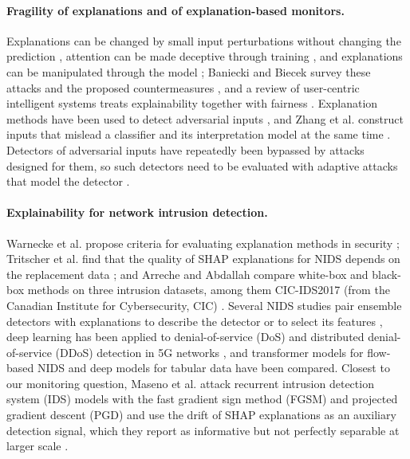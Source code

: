 \paragraph{Fragility of explanations and of explanation-based monitors.}
Explanations can be changed by small input perturbations without changing the prediction
\cite{ghorbani2019,dombrowski2019}, attention can be made deceptive through training \cite{pruthi2020}, and
explanations can be manipulated through the model \cite{heo2019,slack2020}; Baniecki and Biecek survey these attacks
and the proposed countermeasures \cite{baniecki2024}, and a review of user-centric intelligent systems treats
explainability together with fairness \cite{zahid2025}.
Explanation methods have been used to detect adversarial inputs \cite{fidel2020}, and Zhang et al. construct inputs that
mislead a classifier and its interpretation model at the same time \cite{zhang2020}.
Detectors of adversarial inputs have repeatedly been bypassed by attacks designed for them, so such detectors need to be
evaluated with adaptive attacks that model the detector \cite{carlini2017,tramer2020}.

\paragraph{Explainability for network intrusion detection.}
Warnecke et al. propose criteria for evaluating explanation methods in security \cite{warnecke2020}; Tritscher et al.
find that the quality of SHAP explanations for NIDS depends on the replacement data \cite{tritscher2023}; and Arreche
and Abdallah compare white-box and black-box methods on three intrusion datasets, among them CIC-IDS2017 (from the
Canadian Institute for Cybersecurity, CIC) \cite{arreche2025}.
Several NIDS studies pair ensemble detectors with explanations to describe the detector or to select its features
\cite{ahmed2024haenid,ahmed2025hcivad,ahmed2025consensus,ahmed2024shap}, deep learning has been applied to
denial-of-service (DoS) and distributed denial-of-service (DDoS) detection in 5G networks \cite{albashayreh2025}, and
transformer models for flow-based NIDS \cite{manocchio2024} and deep models for tabular data \cite{borisov2024} have been
compared.
Closest to our monitoring question, Maseno et al. attack recurrent intrusion detection system (IDS) models with the fast
gradient sign method (FGSM) and projected gradient descent (PGD) and use the drift of SHAP explanations as an auxiliary
detection signal, which they report as informative but not perfectly separable at larger scale \cite{maseno2026}.


